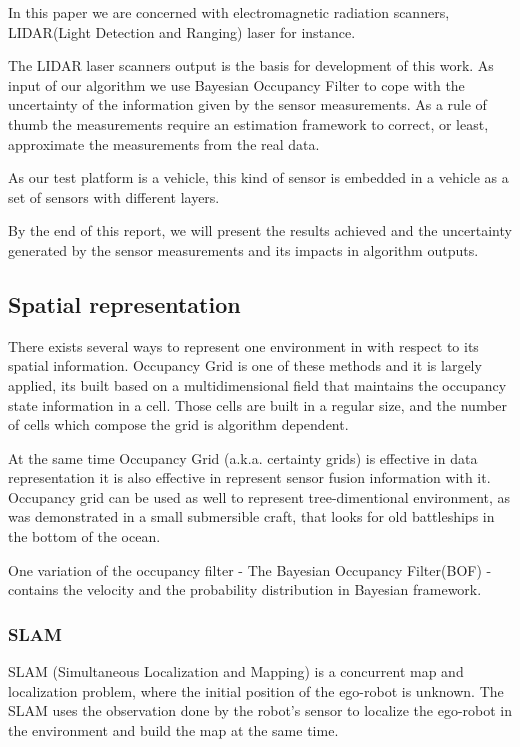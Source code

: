 \documentclass{llncs}
\begin{document}
In this paper we are concerned with electromagnetic radiation scanners, LIDAR(Light Detection and Ranging) laser for instance.

The LIDAR laser scanners output is the basis for development of this work. As input of our algorithm we use Bayesian Occupancy Filter \cite{TAY-2008-295084} to cope with the uncertainty of the information given by the sensor measurements. As a rule of thumb the measurements require an estimation framework to correct, or least, approximate the measurements from the real data.

As our test platform is a vehicle, this kind of sensor is embedded in a vehicle as a set of sensors with different layers.

By the end of this report, we will present the results achieved and the uncertainty generated by the sensor measurements and its impacts in algorithm outputs.

\subsection{Spatial representation}

There exists several ways to represent one environment in with respect to its spatial information. Occupancy Grid is one of these methods and it is largely applied, its built based on a multidimensional field that maintains the occupancy state information in a cell\cite{Elfes:1989:UOG:68491.68495}. Those cells are built in a regular size, and the number of cells which compose the grid is algorithm dependent. 

At the same time Occupancy Grid (a.k.a. certainty grids) is effective in data representation it is also effective in represent sensor fusion information with it. Occupancy grid can be used as well to represent tree-dimentional environment, as was demonstrated in a small submersible craft, that looks for old battleships in the bottom of the ocean\cite{DBLP:journals/aim/Moravec88}.

One variation of the occupancy filter - The Bayesian Occupancy Filter(BOF) - contains the velocity and the probability distribution in Bayesian framework.


\subsubsection{SLAM}

SLAM (Simultaneous Localization and Mapping) is a concurrent map and localization problem, where the initial position of the ego-robot is unknown. The SLAM uses the observation done by the robot's sensor to localize the ego-robot in the environment and build the map at the same time\cite{VU-2009-454238}. 
\end{document}
